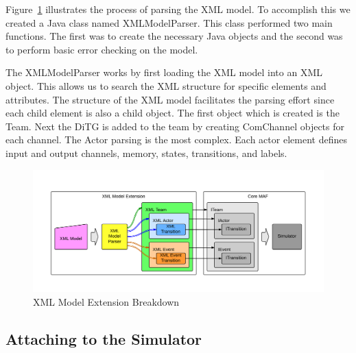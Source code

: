 Figure~\ref{fig:xml_model_extension} illustrates the process of parsing the XML model.  To accomplish this we created a Java class named XMLModelParser.  This class performed two main functions.  The first was to create the necessary Java objects and the second was to perform basic error checking on the model.  

The XMLModelParser works by first loading the XML model into an XML object.  This allows us to search the XML structure for specific elements and attributes.  The structure of the XML model facilitates the parsing effort since each child element is also a child object.  The first object which is created is the Team.  Next the DiTG is added to the team by creating ComChannel objects for each channel.  The Actor parsing is the most complex.  Each actor element defines input and output channels, memory, states, transitions, and labels.

\begin{figure}[h]
\begin{center}
\includegraphics[width=6in]{xml_model_extension.png}
\caption{XML Model Extension Breakdown}
\label{fig:xml_model_extension}
\end{center}
\end{figure}

\subsection{Attaching to the Simulator}

